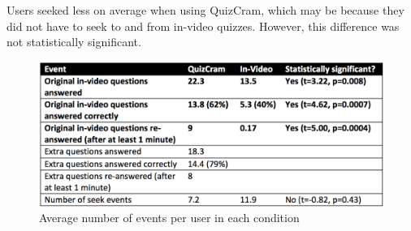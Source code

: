 \documentclass{chi-ext}
\begin{document}
Users seeked less on average when using QuizCram, which may be because they did not have to seek to and from in-video quizzes. However, this difference was not statistically significant.

\begin{figure}
\centering
\includegraphics[width=1.0\columnwidth]{event-logs}
\caption{Average number of events per user in each condition}
\label{fig:event-logs}
\end{figure}





\end{document}
